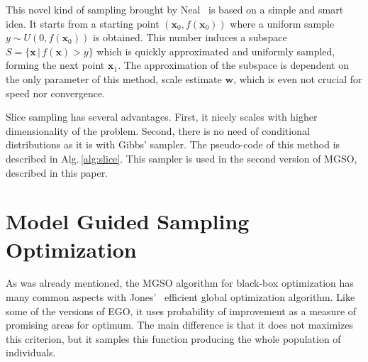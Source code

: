 \documentclass{itatnew}
\newcommand{\xx}{\mathrm{\mathbf{x}}}
\begin{document}
This novel kind of sampling brought by Neal~\cite{neal_slice_2003} is based on a simple and smart idea. It starts from a starting point $(\xx_0, f(\xx_0))$ where a uniform sample $y \sim U(0,f(\xx_0))$ is obtained. This number induces a subspace $S=\{\xx\,|\,f(\xx) > y\}$ which is quickly approximated and uniformly sampled, forming the next point $\xx_1$. The approximation of the subspace is dependent on the only parameter of this method, scale estimate $\mathbf{w}$, which is even not crucial for speed nor convergence.

Slice sampling has several advantages. First, it nicely scales with higher dimensionality of the problem. Second, there is no need of conditional distributions as it is with Gibbs' sampler. The pseudo-code of this method is described in Alg.\,\ref{alg:slice}. This sampler is used in the second version of MGSO, described in this paper.


\section{Model Guided Sampling Optimization}
\label{sec:mgso}

As was already mentioned, the MGSO algorithm for black-box optimization has many common aspects with Jones'~\cite{jones_efficient_1998} efficient global optimization algorithm. Like some of the versions of EGO, it uses probability of improvement as a measure of promising areas for optimum. The main difference is that it does not maximizes this criterion, but it samples this function producing the whole population of individuals. 
\end{document}
